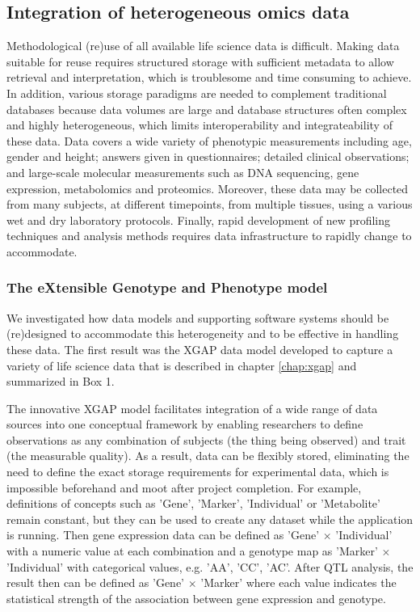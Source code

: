 \subsection{Integration of heterogeneous omics data} \label{modelsection_integration}

Methodological (re)use of all available life science data is difficult.
Making data suitable for reuse requires structured storage with sufficient metadata to allow retrieval and interpretation, which is troublesome and time consuming to achieve.
In addition, various storage paradigms are needed to complement traditional databases because data volumes are large and database structures often complex and highly heterogeneous\cite{Swertz_2007}, which limits interoperability and integrateability of these data.
Data covers a wide variety of phenotypic measurements including age, gender and height; answers given in questionnaires; detailed clinical observations; and large-scale molecular measurements such as DNA sequencing, gene expression, metabolomics and proteomics.
Moreover, these data may be collected from many subjects, at different timepoints, from multiple tissues, using a various wet and dry laboratory protocols.
Finally, rapid development of new profiling techniques and analysis methods requires data infrastructure to rapidly change to accommodate.

\subsubsection*{The eXtensible Genotype and Phenotype model}

We investigated how data models and supporting software systems should be (re)designed to accommodate this heterogeneity and to be effective in handling these data.
The first result was the XGAP data model developed to capture a variety of life science data that is described in chapter \ref{chap:xgap} and summarized in Box 1.

\begin{tcolorbox}[width=\textwidth,colframe=deeporange,colback={white},title={Box 1: Brief explanation of the XGAP data model},colbacktitle=white,coltitle=black,enhanced]
The innovative XGAP model facilitates integration of a wide range of data sources into one conceptual framework by enabling researchers to define observations as any combination of subjects (the thing being observed) and trait (the measurable quality).
As a result, data can be flexibly stored, eliminating the need to define the exact storage requirements for experimental data, which is impossible beforehand and moot after project completion.
For example, definitions of concepts such as 'Gene', 'Marker', 'Individual' or 'Metabolite' remain constant, but they can be used to create any dataset while the application is running.
Then gene expression data can be defined as 'Gene' $\times$ 'Individual' with a numeric value at each combination and a genotype map as 'Marker' $\times$ 'Individual' with categorical values, e.g. 'AA', 'CC', 'AC'.
After QTL analysis, the result then can be defined as 'Gene' $\times$ 'Marker' where each value indicates the statistical strength of the association between gene expression and genotype.
\end{tcolorbox}

